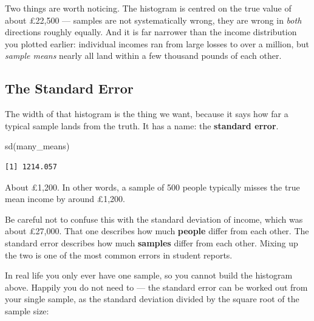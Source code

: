 \documentclass[
  letterpaper,
  DIV=11,
  numbers=noendperiod]{scrreprt}
\newenvironment{Shaded}{\begin{snugshade}}{\end{snugshade}}
\newcommand{\DecValTok}[1]{\textcolor[rgb]{0.68,0.00,0.00}{#1}}
\newcommand{\FunctionTok}[1]{\textcolor[rgb]{0.28,0.35,0.67}{#1}}
\newcommand{\NormalTok}[1]{\textcolor[rgb]{0.00,0.23,0.31}{#1}}
\newcommand{\SpecialCharTok}[1]{\textcolor[rgb]{0.37,0.37,0.37}{#1}}
\begin{document}
Two things are worth noticing. The histogram is centred on the true
value of about £22,500 --- samples are not systematically wrong, they
are wrong in \emph{both} directions roughly equally. And it is far
narrower than the income distribution you plotted earlier: individual
incomes ran from large losses to over a million, but \emph{sample means}
nearly all land within a few thousand pounds of each other.

\subsection{The Standard Error}\label{the-standard-error}

The width of that histogram is the thing we want, because it says how
far a typical sample lands from the truth. It has a name: the
\textbf{standard error}.

\begin{Shaded}
\begin{Highlighting}[]
\FunctionTok{sd}\NormalTok{(many\_means)}
\end{Highlighting}
\end{Shaded}

\begin{verbatim}
[1] 1214.057
\end{verbatim}

About £1,200. In other words, a sample of 500 people typically misses
the true mean income by around £1,200.

Be careful not to confuse this with the standard deviation of income,
which was about £27,000. That one describes how much \textbf{people}
differ from each other. The standard error describes how much
\textbf{samples} differ from each other. Mixing up the two is one of the
most common errors in student reports.

In real life you only ever have one sample, so you cannot build the
histogram above. Happily you do not need to --- the standard error can
be worked out from your single sample, as the standard deviation divided
by the square root of the sample size:

\begin{Shaded}
\end{Shaded}
\end{document}
